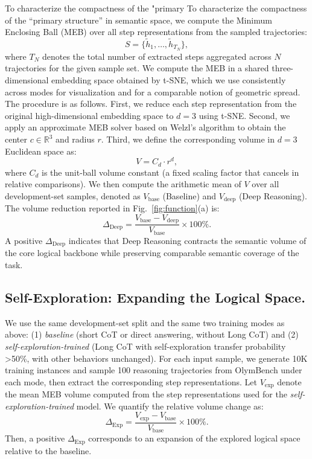 To characterize the compactness of the "primary To characterize the compactness of the ``primary structure'' in semantic space, we compute the Minimum Enclosing Ball (MEB) over all step representations from the sampled trajectories:
\begin{equation}
  S = \{\tilde{h}_1, \dots, \tilde{h}_{T_{N}}\},
\end{equation}
where \(T_N\) denotes the total number of extracted steps aggregated across \(N\) trajectories for the given sample set. We compute the MEB in a shared three-dimensional embedding space obtained by t-SNE, which we use consistently across modes for visualization and for a comparable notion of geometric spread.
The procedure is as follows. First, we reduce each step representation from the original high-dimensional embedding space to \(d=3\) using t-SNE. Second, we apply an approximate MEB solver based on Welzl's algorithm to obtain the center \(c \in \mathbb{R}^{3}\) and radius \(r\). Third, we define the corresponding volume in \(d=3\) Euclidean space as:
\begin{equation}
V = C_d \cdot r^{d},
\end{equation}
where \(C_d\) is the unit-ball volume constant (a fixed scaling factor that cancels in relative comparisons).
We then compute the arithmetic mean of \(V\) over all development-set samples, denoted as \(V_{\text{base}}\) (Baseline) and \(V_{\text{deep}}\) (Deep Reasoning). The volume reduction reported in Fig.~\ref{fig:function}(a) is:
\begin{equation}
\Delta_{\text{Deep}} = \frac{V_{\text{base}} - V_{\text{deep}}}{V_{\text{base}}} \times 100\%.
\end{equation}
A positive \(\Delta_{\text{Deep}}\) indicates that Deep Reasoning contracts the semantic volume of the core logical backbone while preserving comparable semantic coverage of the task.


\subsection{Self-Exploration: Expanding the Logical Space.}
We use the same development-set split and the same two training modes as above: (1) \textit{baseline} (short CoT or direct answering, without Long CoT) and (2) \textit{self-exploration-trained} (Long CoT with self-exploration transfer probability >50\%, with other behaviors unchanged). For each input sample, we generate 10K training instances and sample 100 reasoning trajectories from OlymBench under each mode, then extract the corresponding step representations.
Let \(V_{\text{exp}}\) denote the mean MEB volume computed from the step representations used for the \textit{self-exploration-trained} model. We quantify the relative volume change as:
\begin{equation}
\Delta_{\text{Exp}} = \frac{V_{\text{exp}} - V_{\text{base}}}{V_{\text{base}}} \times 100\%.
\end{equation}
Then, a positive \(\Delta_{\text{Exp}}\) corresponds to an expansion of the explored logical space relative to the baseline.


